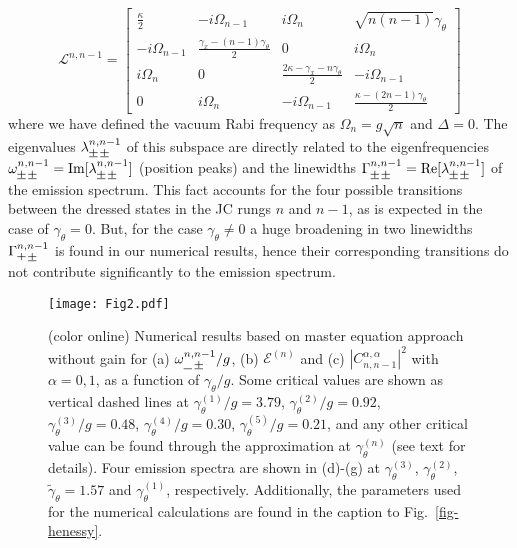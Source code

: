 \documentclass[aps,prl,showpacs,twocolumn]{revtex4}
\newcommand{\pms}{\mathbin{\tikz[x=1.4ex,y=1.4ex,line width=.1ex] \draw (0.0,0) -- (1.0,0) (0.5,0.08) -- (0.5,0.92) (0.0,0.5) -- (1.0,0.5);}}%
\newcommand{\p}{\mathbin{\tikz[x=1.4ex,y=1.4ex,line width=.1ex] \draw (0.0,0) -- (0.0,0) (0.5,0.08) -- (0.5,0.92) (0.0,0.5) -- (1.0,0.5);}}%
\newcommand{\m}{\mathbin{\tikz[x=1.4ex,y=1.4ex,line width=.1ex] \draw (0.0,0) -- (1.0,0) ;}}
\begin{document}
%
\begin{equation}
\mathcal{L}^{n,n-1}=
\begin{bmatrix}
\frac{\kappa}{2} & -i\Omega_{n-1} & i\Omega_{n} & \sqrt{n(n-1)}\gamma_{\theta} \\
-i\Omega_{n-1} & \frac{\gamma_x-(n-1)\gamma_{\theta}}{2} & 0 & i\Omega_{n}   \\
i\Omega_{n} & 0 & \frac{2\kappa-\gamma_x-n\gamma_{\theta}}{2} &-i\Omega_{n-1}   \\
    0 & i\Omega_{n} & -i\Omega_{n-1} & \frac{\kappa-(2n-1)\gamma_{\theta}}{2}
\end{bmatrix}
\end{equation}
%
where we have defined the vacuum Rabi frequency as $\Omega_n=g\sqrt{n}$ and $\Delta=0$. The eigenvalues $\lambda^{n,n-1}_{\pms\,\pms}$ of this subspace are directly related to the eigenfrequencies  $\omega^{n,n-1}_{\pms\,\pms}=\text{Im}[\lambda^{n,n-1}_{\pms\,\pms}]$ (position peaks) and the linewidths $\Gamma^{n,n-1}_{\pms\,\pms}=\text{Re}[\lambda^{n,n-1}_{\pms\,\pms}]$ of the emission spectrum. This fact accounts for the four possible transitions between the dressed states in the JC rungs $n$ and $n-1$, as is expected in the case of $\gamma_\theta=0$. But, for the case $\gamma_\theta\neq0$ a huge broadening in two linewidths $\Gamma^{n,n-1}_{\p\,\pms}$ is found in our numerical results, hence their corresponding transitions do not contribute significantly to the emission spectrum.
\begin{figure}[h!]
\centering
\texttt{[image: Fig2.pdf]}
\caption{(color online) Numerical results based on master equation approach without gain for
(a) $\omega^{n,n-1}_{\protect\m\,\protect\pms}/g$, (b) $\mathcal{E}^{(n)}$ and (c) $|C^{\alpha,\alpha}_{n,n-1}|^2$  with $\alpha=0,1$, as a function of $\gamma_{\theta}/g$. Some critical values are shown as vertical dashed lines at $\gamma_{\theta}^{(1)}/g=3.79$, $\gamma_{\theta}^{(2)}/g=0.92$,  
$\gamma_{\theta}^{(3)}/g=0.48$, $\gamma_{\theta}^{(4)}/g=0.30$, $\gamma_{\theta}^{(5)}/g=0.21$, and any other critical value can be found through the approximation at $\gamma_{\theta}^{(n)}$ (see text for details). Four emission spectra are shown in (d)-(g) at   $\gamma_{\theta}^{(3)}$, $\gamma_{\theta}^{(2)}$,
$\tilde{\gamma}_{\theta}=1.57$ and $\gamma_{\theta}^{(1)}$, respectively. Additionally, the
parameters used for the numerical calculations are found in the caption to Fig.~\ref{fig-henessy}.}\label{fig-1}
\end{figure}
\end{document}
